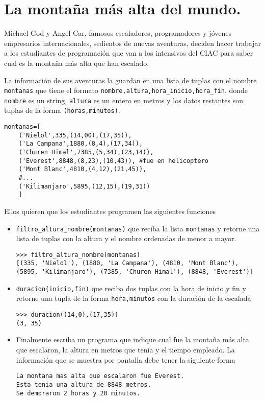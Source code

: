 \section{La montaña más alta del mundo.}

Michael God y Angel Car, famosos escaladores, programadores y jóvenes empresarios internacionales, sedientos de nuevas aventuras, deciden hacer trabajar a los estudiantes de programación que van a los intensivos del CIAC para saber cual es la montaña más alta que han escalado.


La información de sus aventuras la guardan en una lista de tuplas con el nombre \texttt{montanas} que tiene el formato \texttt{nombre,altura,hora\_inicio,hora\_fin}, donde \texttt{nombre} es un string, \texttt{altura} es un entero en metros y los datos restantes son tuplas de la forma \texttt{(horas,minutos)}.


\begin{lstlisting}[style=consola]
montanas=[
    ('Nielol',335,(14,00),(17,35)),
    ('La Campana',1880,(8,4),(17,34)),
    ('Churen Himal',7385,(5,34),(23,14)),
    ('Everest',8848,(8,23),(10,43)), #fue en helicoptero
    ('Mont Blanc',4810,(4,12),(21,45)),
    #...
    ('Kilimanjaro',5895,(12,15),(19,31))
    ]

\end{lstlisting}

Ellos quieren que los estudiantes programen las siguientes funciones

\begin{itemize}
    \item \texttt{filtro\_altura\_nombre(montanas)} que reciba la lista \texttt{montanas} y retorne una lista de tuplas con la altura y el nombre ordenadas de menor a mayor.
    \\
    \begin{lstlisting}[style=consola]
>>> filtro_altura_nombre(montanas)
[(335, 'Nielol'), (1880, 'La Campana'), (4810, 'Mont Blanc'), 
(5895, 'Kilimanjaro'), (7385, 'Churen Himal'), (8848, 'Everest')]
    \end{lstlisting}

    \item \texttt{duracion(inicio,fin)} que reciba dos tuplas con la hora de inicio y fin y retorne una tupla de la forma \texttt{hora,minutos} con la duración de la escalada

    \begin{lstlisting}[style=consola]
>>> duracion((14,0),(17,35))
(3, 35)
    \end{lstlisting}
    \item Finalmente escriba un programa que indique cual fue la montaña más alta que escalaron, la altura en metros que tenía y el tiempo empleado. La información que se muestra por pantalla debe tener la siguiente forma
    \begin{lstlisting}[style=consola]
La montana mas alta que escalaron fue Everest.
Esta tenia una altura de 8848 metros.
Se demoraron 2 horas y 20 minutos.
    \end{lstlisting}
    
\end{itemize}